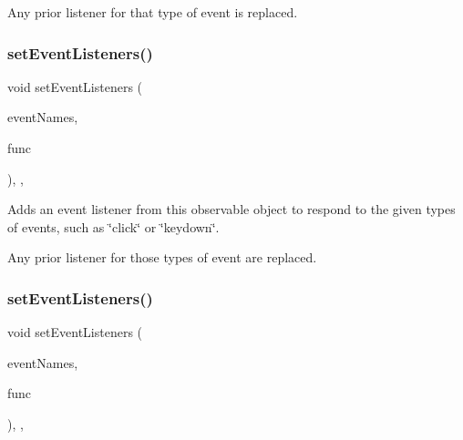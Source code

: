 Any prior listener for that type of event is replaced. \mbox{\label{classsgl_1_1GObservable_afa388d69c33c718cf035774604065604}} 
\subsubsection{\texorpdfstring{set\+Event\+Listeners()}{setEventListeners()}\hspace{0.1cm}{\footnotesize\ttfamily [1/2]}}
{\footnotesize\ttfamily void set\+Event\+Listeners (\begin{DoxyParamCaption}\item[{std\+::initializer\+\_\+list$<$ std\+::string $>$}]{event\+Names,  }\item[{\mbox{\hyperlink{namespacesgl_ae9f3e9eab70035da1a2b114e21357b25}{G\+Event\+Listener}}}]{func }\end{DoxyParamCaption})\hspace{0.3cm}{\ttfamily [protected]}, {\ttfamily [virtual]}, {\ttfamily [inherited]}}



Adds an event listener from this observable object to respond to the given types of events, such as \char`\"{}click\char`\"{} or \char`\"{}keydown\char`\"{}. 

Any prior listener for those types of event are replaced. \mbox{\label{classsgl_1_1GObservable_a7867184bbb686f74fae8a4db927da799}} 
\subsubsection{\texorpdfstring{set\+Event\+Listeners()}{setEventListeners()}\hspace{0.1cm}{\footnotesize\ttfamily [2/2]}}
{\footnotesize\ttfamily void set\+Event\+Listeners (\begin{DoxyParamCaption}\item[{std\+::initializer\+\_\+list$<$ std\+::string $>$}]{event\+Names,  }\item[{\mbox{\hyperlink{namespacesgl_a54427ce97bb1c2804e4fe2b0a62e8b17}{G\+Event\+Listener\+Void}}}]{func }\end{DoxyParamCaption})\hspace{0.3cm}{\ttfamily [protected]}, {\ttfamily [virtual]}, {\ttfamily [inherited]}}



